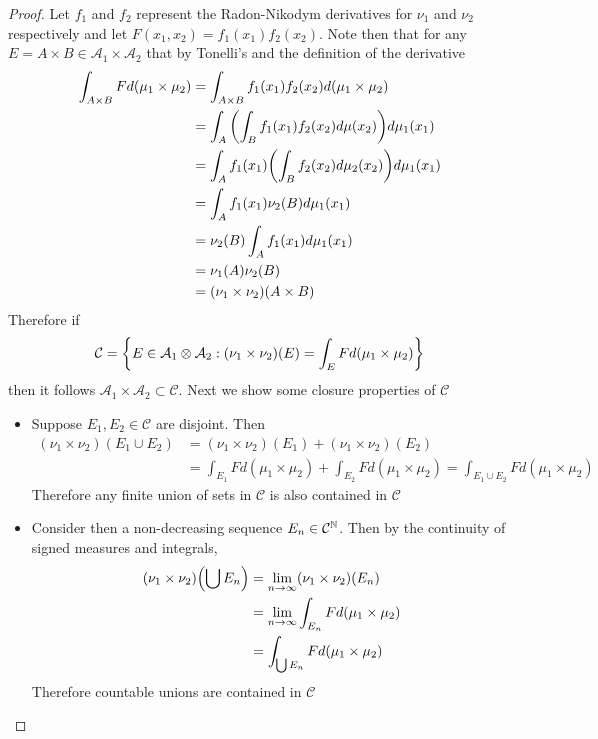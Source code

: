 \documentclass[hw_all.tex]{subfiles}
\begin{document}
\begin{proof}
    Let $f_1$ and $f_2$ represent the Radon-Nikodym derivatives for $\nu_1$ and $\nu_2$ respectively and let $F(x_1,x_2) = f_1(x_1) f_2(x_2)$. Note then that for any $E = A \times B \in \mathcal{A}_1 \times \mathcal{A}_2$ that by Tonelli's and the definition of the derivative
    \begin{align*}
        \int_{A \times B} F d(\mu_1 \times \mu_2) &= \int_{A \times B} f_1(x_1) f_2(x_2) d(\mu_1 \times \mu_2) \\
        &= \int_A \qty(\int_B f_1(x_1) f_2(x_2) d\mu(x_2)) d \mu_1(x_1) \\
        &= \int_A f_1(x_1) \qty(\int_B f_2(x_2) d \mu_2(x_2)) d \mu_1(x_1) \\
        &= \int_A f_1(x_1) \nu_2(B) d \mu_1(x_1) \\
        &= \nu_2(B) \int_A f_1(x_1) d \mu_1(x_1) \\
        &= \nu_1(A)\nu_2(B) \\
        &= (\nu_1 \times \nu_2)(A \times B)
    \end{align*}
    Therefore if 
    \[
        \mathcal{C} = \qty{E \in \mathcal{A}_1 \otimes \mathcal{A}_2 : (\nu_1 \times \nu_2)(E) = \int_E F d(\mu_1 \times \mu_2)}
    \]
    then it follows $\mathcal{A}_1 \times \mathcal{A}_2 \subset \mathcal{C}$. Next we show some closure properties of $\mathcal{C}$
    \begin{itemize}
        \item[\textbf{Disjoint Unions})]
            Suppose $E_1, E_2 \in \mathcal{C}$ are disjoint. Then
            \begin{align*}
                (\nu_1 \times \nu_2)(E_1 \cup E_2) &= (\nu_1 \times \nu_2)(E_1) + (\nu_1 \times \nu_2)(E_2)  \\
                                                   &= \int_{E_1} F d(\mu_1 \times \mu_2) + \int_{E_2} F d(\mu_1 \times \mu_2) = \int_{E_1 \cup E_2} F d(\mu_1 \times \mu_2)
            \end{align*}
            Therefore any finite union of sets in $\mathcal{C}$ is also contained in $\mathcal{C}$

        \item[\textbf{Increasing Seq.})]
            Consider then a non-decreasing sequence $E_n \in \mathcal{C}^{\mathbb{N}}$. Then by the continuity of signed measures and integrals,
            \begin{align*}
                (\nu_1 \times \nu_2)\qty(\bigcup E_n) &= \lim_{n \to \infty} (\nu_1 \times \nu_2)(E_n) \\
                &= \lim_{n \to \infty} \int_{E_n} F d(\mu_1 \times \mu_2) \\
                &= \int_{\bigcup E_n} F d(\mu_1 \times \mu_2)
            \end{align*}
            Therefore countable unions are contained in $\mathcal{C}$


\end{itemize}
\end{proof}
\end{document}
